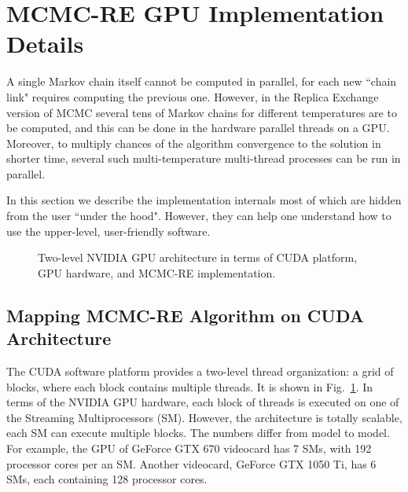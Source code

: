 \documentclass[preprint2]{aastex}
\begin{document}
\section{MCMC-RE GPU Implementation Details}

A single Markov chain itself cannot be computed in parallel, for each new ``chain link"
requires computing the previous one. However, in the Replica Exchange
version of MCMC several tens of Markov chains for different temperatures
are to be computed, and this can be done in the hardware parallel threads
on a GPU. Moreover, to multiply chances of the algorithm convergence
to the solution in shorter time, several such multi-temperature multi-thread 
processes can be run in parallel.

In this section we describe the implementation internals most of which are hidden 
from the user ``under the hood". However, they can help one understand how to 
use the upper-level, user-friendly software.


\begin{figure}[ht!]    %
\caption{\small Two-level NVIDIA GPU architecture in terms of CUDA platform, GPU hardware, and MCMC-RE implementation.
\label{mcmc_cuda_hw}}
\end{figure}


\subsection{Mapping MCMC-RE Algorithm on CUDA Architecture}

The CUDA software platform provides a two-level thread organization: a grid of 
blocks, where each block contains multiple threads. It is shown in Fig.~\ref{mcmc_cuda_hw}.
In terms of the NVIDIA GPU hardware, each block of threads is executed on
one of the Streaming Multiprocessors (SM). However, the architecture is
totally scalable, each SM can execute multiple blocks. The numbers differ
from model to model. For example, the GPU of GeForce GTX 670 videocard
has 7 SMs, with 192 processor cores per an SM. Another videocard,
GeForce GTX 1050 Ti, has 6 SMs, each containing 128 processor cores. 
\end{document}
